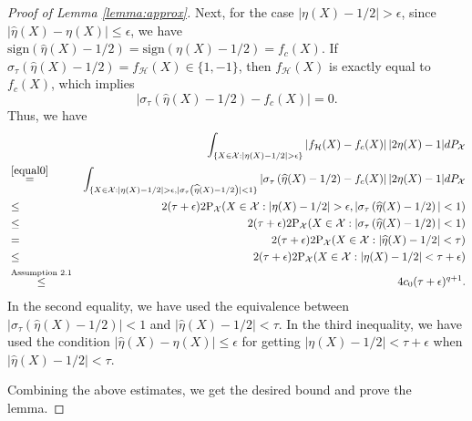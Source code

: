 \documentclass{article}
\begin{document}
\begin{proof}[Proof of Lemma \ref{lemma:approx}]
 Next, for the case $|\eta(X)-1/2| > \epsilon$,  since  $|\widehat{\eta}(X)-\eta(X)|\leq \epsilon$, we have $\text{sign}(\widehat{\eta}(X) -1/2) = \text{sign} (\eta(X) -1/2)= f_c(X)$. 
 If $\sigma_\tau\left(\widehat{\eta}(X) -1/2\right)= f_\mathcal{H}(X)  \in \{1, -1\}$, then $f_\mathcal{H}(X) $ is exactly equal to $f_c(X)$, which implies \begin{equation}\label{equal0}
\left|\sigma_\tau\left(\widehat{\eta}(X)-1/2\right) - f_c(X)\right|=0.
 \end{equation}
 Thus, we have
 \begin{eqnarray*}
  &&\int_{\{X\in \mathcal{X}:  |\eta(X)-1/2| > \epsilon\} }  \left| f_\mathcal{H}(X) - f_c(X)\right|  |2\eta(X)-1| d P_\mathcal{X}  \\
  &\stackrel{\eqref{equal0}}{=}&\int_{\{X\in \mathcal{X}:   |\eta(X)-1/2| > \epsilon, |\sigma_\tau\left(\widehat{\eta}(X) -1/2\right)|< 1\}}  \left| \sigma_\tau\left(\widehat{\eta}(X)-1/2\right) - f_c(X)\right| |2\eta(X)-1| d P_\mathcal{X}  \\
  &\leq& 2(\tau + \epsilon)  2  \mathrm{P}_{\mathcal{X}}(X\in \mathcal{X}:|\eta(X)-1/2| > \epsilon, |\sigma_\tau\left(\widehat{\eta}(X) -1/2\right)|< 1)\\
  &\leq& 2(\tau + \epsilon) 2  \mathrm{P}_{\mathcal{X}}(X\in \mathcal{X}: |\sigma_\tau\left(\widehat{\eta}(X) -1/2\right)|< 1)\\
  &=& 2(\tau + \epsilon)2  \mathrm{P}_{\mathcal{X}}(X\in \mathcal{X}: |\widehat{\eta}(X) -1/2| < \tau) \\
  &\leq& 2(\tau + \epsilon) 2  \mathrm{P}_{\mathcal{X}}(X\in \mathcal{X}:  |\eta(X) -1/2| < \tau + \epsilon)\\
  &\stackrel{\text{Assumption 2.1}}{\leq}& 4c_0(\tau + \epsilon)^{q+1}.
\end{eqnarray*}
In the second equality, we have used the equivalence between $|\sigma_\tau\left(\widehat{\eta}(X) -1/2\right)|< 1$ and $|\widehat{\eta}(X) -1/2| < \tau$.
In the third inequality, we have used the condition $|\widehat{\eta}(X)-\eta(X)| \leq \epsilon$ for getting $|\eta(X) -1/2| < \tau + \epsilon$ when $|\widehat{\eta}(X) -1/2| < \tau$.

 Combining the above estimates, we get the desired bound and prove the lemma.
\end{proof}
\end{document}

